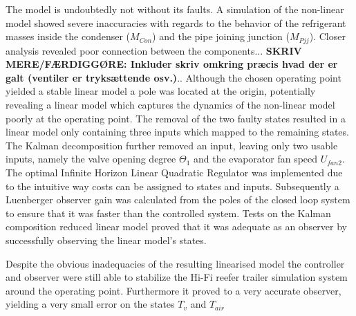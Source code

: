 The model is undoubtedly not without its faults. A simulation of the non-linear model showed severe inaccuracies with regards to the behavior of the refrigerant masses inside the condenser ($M_{Con}$) and the pipe joining junction ($M_{Pjj}$). Closer analysis revealed poor connection between the components... \textbf{SKRIV MERE/FÆRDIGGØRE: Inkluder skriv omkring præcis hvad der er galt (ventiler er tryksættende osv.)}.. Although the chosen operating point yielded a stable linear model a pole was located at the origin, potentially revealing a linear model which captures the dynamics of the non-linear model poorly at the operating point. The removal of the two faulty states resulted in a linear model only containing three inputs which mapped to the remaining states. The Kalman decomposition further removed an input, leaving only two usable inputs, namely the valve opening degree $\Theta_1$ and the evaporator fan speed $U_{fan2}$. The optimal Infinite Horizon Linear Quadratic Regulator was implemented due to the intuitive way costs can be assigned to states and inputs. Subsequently a Luenberger observer gain was calculated from the poles of the closed loop system to ensure that it was faster than the controlled system. Tests on the Kalman composition reduced linear model proved that it was adequate as an observer by successfully observing the linear model's states.

Despite the obvious inadequacies of the resulting linearised model the controller and observer were still able to stabilize the Hi-Fi reefer trailer simulation system around the operating point. Furthermore it proved to a very accurate observer, yielding a very small error on the states $T_v$ and $T_{air}$
